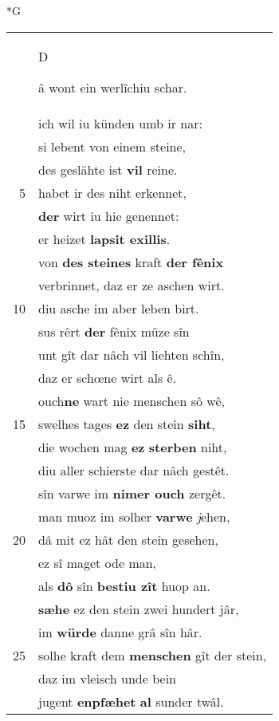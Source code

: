 \documentclass[8pt,a4paper,notitlepage]{article}
\begin{document}
\begin{table}[ht]
\begin{minipage}[t]{0.5\linewidth}
\small
\begin{center}*G
\end{center}
\begin{tabular}{rl}
 & \begin{large}D\end{large}â wont ein werlîchiu schar.\\ 
 & ich wil iu künden umb ir nar:\\ 
 & si lebent von einem steine,\\ 
 & des geslähte ist \textbf{vil} reine.\\ 
5 & habet ir des niht erkennet,\\ 
 & \textbf{der} wirt iu hie genennet:\\ 
 & er heizet \textbf{lapsit exillis}.\\ 
 & von \textbf{des steines} kraft \textbf{der fênix}\\ 
 & verbrinnet, daz er ze aschen wirt.\\ 
10 & diu asche im aber leben birt.\\ 
 & sus rêrt \textbf{der} fênix mûze sîn\\ 
 & unt gît dar nâch vil liehten schîn,\\ 
 & daz er schœne wirt als ê.\\ 
 & ouch\textbf{ne} wart nie menschen sô wê,\\ 
15 & swelhes tages \textbf{ez} den stein \textbf{siht},\\ 
 & die wochen mag \textbf{ez} \textbf{sterben} niht,\\ 
 & diu aller schierste dar nâch gestêt.\\ 
 & sîn varwe im \textbf{nimer ouch} zergêt.\\ 
 & man muoz im solher \textbf{varwe} \textit{j}ehen,\\ 
20 & dâ mit ez hât den stein gesehen,\\ 
 & ez sî maget ode man,\\ 
 & als \textbf{dô} sîn \textbf{bestiu zît} huop an.\\ 
 & \textbf{sæhe} ez den stein zwei hundert jâr,\\ 
 & im \textbf{würde} danne grâ sîn hâr.\\ 
25 & solhe kraft dem \textbf{menschen} gît der stein,\\ 
 & daz im vleisch unde bein\\ 
 & jugent \textbf{enpfæhet} \textbf{al} sunder twâl.\\ 

\end{tabular}
\end{minipage}
\end{table}
\end{document}

